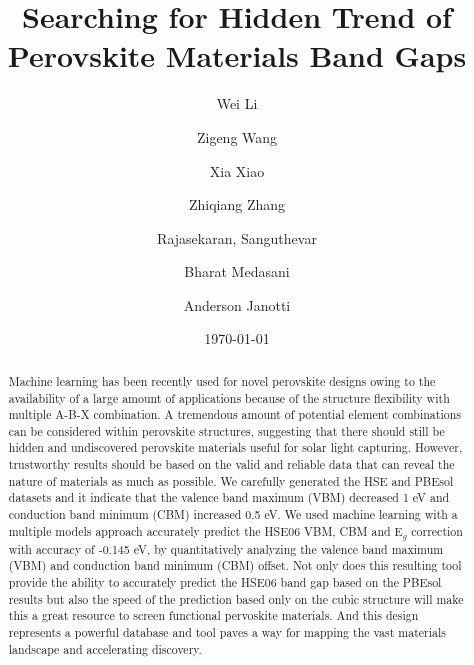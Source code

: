 \documentclass[%
reprint,
superscriptaddress,
citeautoscript,
 amsmath,amssymb,
 aps,
 prl,
floatfix,
]{revtex4-1}
\begin{document}

\title{Searching for Hidden Trend of Perovskite Materials Band Gaps}

\author{Wei Li}
\author{Zigeng Wang}
\author{Xia Xiao}
\author{Zhiqiang Zhang}
\author{Rajasekaran, Sanguthevar}
\author{Bharat Medasani}
\author{Anderson Janotti}

\date{\today}%
\begin{abstract}

Machine learning has been recently used for novel perovskite designs owing to the availability of a large amount of applications because of the structure flexibility with multiple A-B-X combination. A tremendous amount of potential element combinations can be considered within perovskite structures, suggesting that there should still be hidden and undiscovered perovskite materials useful for solar light capturing. However, trustworthy results should be based on the valid and reliable data that can reveal the nature of materials as much as possible. We carefully generated the HSE and PBEsol datasets and it indicate that the valence band maximum (VBM) decreased 1 eV and conduction band minimum (CBM) increased 0.5 eV. We used machine learning with a multiple models approach accurately predict the HSE06 VBM, CBM and E$_{g}$ correction with accuracy of -0.145 eV, by quantitatively analyzing the valence band maximum (VBM) and conduction band minimum (CBM) offset. Not only does this resulting tool provide the ability to accurately predict the HSE06 band gap based on the PBEsol results but also the speed of the prediction based only on the cubic structure will make this a great resource to screen functional pervoskite materials. And this design represents a powerful database and tool paves a way for mapping the vast materials landscape and accelerating discovery. 


\end{abstract}
\end{document}
